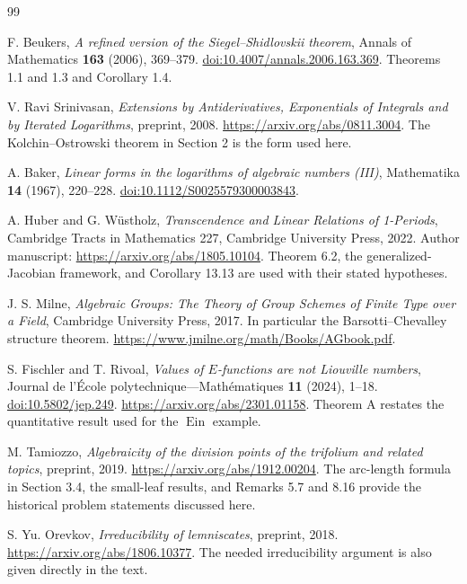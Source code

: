 \documentclass[11pt,a4paper]{article}
\numberwithin{equation}{section}
\theoremstyle{definition}
\theoremstyle{remark}
\newcommand{\Ein}{\operatorname{Ein}}
\begin{document}
\clearpage
\begin{thebibliography}{99}
F. Beukers, \emph{A refined version of the Siegel--Shidlovskii theorem},
Annals of Mathematics \textbf{163} (2006), 369--379.
\href{https://doi.org/10.4007/annals.2006.163.369}{doi:10.4007/annals.2006.163.369}.
Theorems 1.1 and 1.3 and Corollary 1.4.

V. Ravi Srinivasan, \emph{Extensions by Antiderivatives, Exponentials of
Integrals and by Iterated Logarithms}, preprint, 2008.
\url{https://arxiv.org/abs/0811.3004}. The Kolchin--Ostrowski theorem in
Section 2 is the form used here.

A. Baker, \emph{Linear forms in the logarithms of algebraic numbers (III)},
Mathematika \textbf{14} (1967), 220--228.
\href{https://doi.org/10.1112/S0025579300003843}{doi:10.1112/S0025579300003843}.

A. Huber and G. W\"ustholz, \emph{Transcendence and Linear Relations of
1-Periods}, Cambridge Tracts in Mathematics 227, Cambridge University
Press, 2022. Author manuscript:
\url{https://arxiv.org/abs/1805.10104}.
Theorem 6.2, the generalized-Jacobian framework, and Corollary 13.13 are
used with their stated hypotheses.

J. S. Milne, \emph{Algebraic Groups: The Theory of Group Schemes of Finite
Type over a Field}, Cambridge University Press, 2017. In particular the
Barsotti--Chevalley structure theorem.
\url{https://www.jmilne.org/math/Books/AGbook.pdf}.

S. Fischler and T. Rivoal, \emph{Values of $E$-functions are not Liouville
numbers}, Journal de l'\'Ecole polytechnique---Math\'ematiques
\textbf{11} (2024), 1--18.
\href{https://doi.org/10.5802/jep.249}{doi:10.5802/jep.249}.
\url{https://arxiv.org/abs/2301.01158}.
Theorem A restates the quantitative result used for the $\Ein$ example.

M. Tamiozzo, \emph{Algebraicity of the division points of the trifolium
and related topics}, preprint, 2019.
\url{https://arxiv.org/abs/1912.00204}.
The arc-length formula in Section 3.4, the small-leaf results, and
Remarks 5.7 and 8.16 provide the historical problem statements discussed
here.

S. Yu. Orevkov, \emph{Irreducibility of lemniscates}, preprint, 2018.
\url{https://arxiv.org/abs/1806.10377}.
The needed irreducibility argument is also given directly in the text.


\end{thebibliography}
\end{document}
